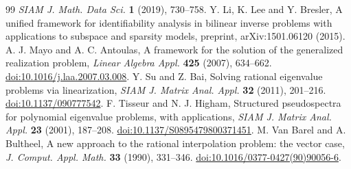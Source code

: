\begin{thebibliography}{99}
\emph{SIAM J. Math. Data Sci.} \textbf{1} (2019), 730--758.
 Y. Li, K. Lee and Y. Bresler,
A unified framework for identifiability analysis in bilinear inverse
problems with applications to subspace and sparsity models,
preprint, arXiv:1501.06120 (2015).
 A. J. Mayo and A. C. Antoulas,
A framework for the solution of the generalized realization problem,
\emph{Linear Algebra Appl.} \textbf{425} (2007), 634--662.
\href{https://doi.org/10.1016/j.laa.2007.03.008}{doi:10.1016/j.laa.2007.03.008}.
 Y. Su and Z. Bai,
Solving rational eigenvalue problems via linearization,
\emph{SIAM J. Matrix Anal. Appl.} \textbf{32} (2011), 201--216.
\href{https://doi.org/10.1137/090777542}{doi:10.1137/090777542}.
 F. Tisseur and N. J. Higham,
Structured pseudospectra for polynomial eigenvalue problems, with
applications, \emph{SIAM J. Matrix Anal. Appl.} \textbf{23} (2001), 187--208.
\href{https://doi.org/10.1137/S0895479800371451}{doi:10.1137/S0895479800371451}.
 M. Van Barel and A. Bultheel,
A new approach to the rational interpolation problem: the vector case,
\emph{J. Comput. Appl. Math.} \textbf{33} (1990), 331--346.
\href{https://doi.org/10.1016/0377-0427(90)90056-6}{doi:10.1016/0377-0427(90)90056-6}.
\end{thebibliography}
